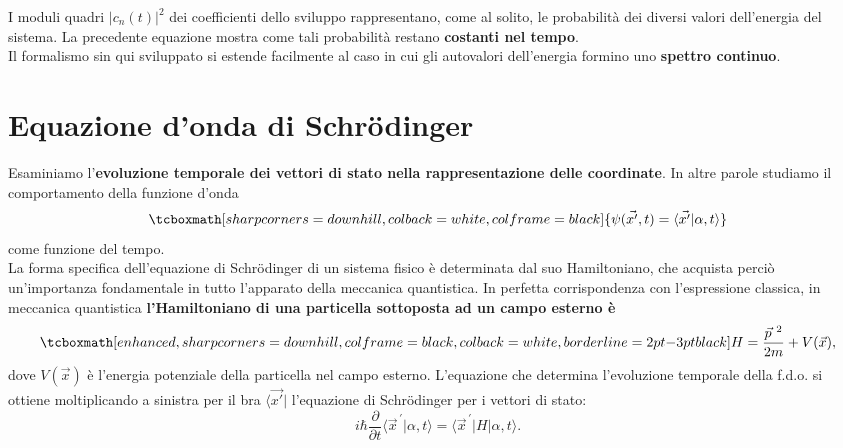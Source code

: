 I moduli quadri $\vert c_n(t)\vert^2$ dei coefficienti dello sviluppo rappresentano, come al solito, le probabilità dei diversi valori dell'energia del sistema. La precedente equazione mostra come tali probabilità restano \textbf{costanti nel tempo}.\\

Il formalismo sin qui sviluppato si estende facilmente al caso in cui gli autovalori dell'energia formino uno \textbf{spettro continuo}.
\section[ Equazione d'onda di Schrödinger]{Equazione d'onda di Schr\"{o}dinger}
Esaminiamo l'\textbf{evoluzione temporale dei vettori di stato nella rappresentazione delle coordinate}. In altre parole studiamo il comportamento della funzione d'onda
	\begin{equation}
		\tcboxmath[sharp corners=downhill, colback=white, colframe=black]{
		\psi (\vec{x'}, t) = \langle \vec{x'}\vert \alpha, t \rangle
		}
	\end{equation}
come funzione del tempo.\\

La forma specifica dell'equazione di Schr\"{o}dinger di un sistema fisico è determinata dal suo Hamiltoniano, che acquista perciò un'importanza fondamentale in tutto l'apparato della meccanica quantistica. In perfetta corrispondenza con l'espressione classica, in meccanica quantistica \textbf{l'Hamiltoniano di una particella sottoposta ad un campo esterno è}
	\begin{equation}
		\tcboxmath[enhanced, sharp corners=downhill, colframe=black, colback=white, borderline={2pt}{-3pt}{black}]{
			H= \frac{\vec{p}^{\ 2}}{2m}+V(\vec{x}),
			}
	\label{eq:cap8_5}
	\end{equation}
dove $V(\vec{x})$ è l'energia potenziale della particella nel campo esterno.		
L'equazione che determina l'evoluzione temporale della f.d.o. si ottiene moltiplicando a sinistra per il bra $\langle \vec{x'}\vert $ l'equazione di Schr\"{o}dinger per i vettori di stato:
	\begin{equation}
		i\hbar \frac{\partial}{\partial t} \langle {\vec{x}}^{\, \prime}\vert \alpha , t \rangle = \langle {\vec{x}}^{\, \prime}\vert H \vert \alpha , t \rangle.
	\end{equation}\\
	
